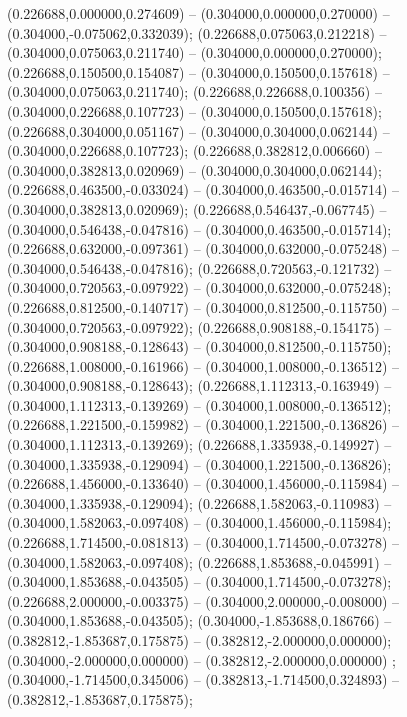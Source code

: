  (0.226688,0.000000,0.274609) -- (0.304000,0.000000,0.270000) -- (0.304000,-0.075062,0.332039);
 (0.226688,0.075063,0.212218) -- (0.304000,0.075063,0.211740) -- (0.304000,0.000000,0.270000);
 (0.226688,0.150500,0.154087) -- (0.304000,0.150500,0.157618) -- (0.304000,0.075063,0.211740);
 (0.226688,0.226688,0.100356) -- (0.304000,0.226688,0.107723) -- (0.304000,0.150500,0.157618);
 (0.226688,0.304000,0.051167) -- (0.304000,0.304000,0.062144) -- (0.304000,0.226688,0.107723);
 (0.226688,0.382812,0.006660) -- (0.304000,0.382813,0.020969) -- (0.304000,0.304000,0.062144);
 (0.226688,0.463500,-0.033024) -- (0.304000,0.463500,-0.015714) -- (0.304000,0.382813,0.020969);
 (0.226688,0.546437,-0.067745) -- (0.304000,0.546438,-0.047816) -- (0.304000,0.463500,-0.015714);
 (0.226688,0.632000,-0.097361) -- (0.304000,0.632000,-0.075248) -- (0.304000,0.546438,-0.047816);
 (0.226688,0.720563,-0.121732) -- (0.304000,0.720563,-0.097922) -- (0.304000,0.632000,-0.075248);
 (0.226688,0.812500,-0.140717) -- (0.304000,0.812500,-0.115750) -- (0.304000,0.720563,-0.097922);
 (0.226688,0.908188,-0.154175) -- (0.304000,0.908188,-0.128643) -- (0.304000,0.812500,-0.115750);
 (0.226688,1.008000,-0.161966) -- (0.304000,1.008000,-0.136512) -- (0.304000,0.908188,-0.128643);
 (0.226688,1.112313,-0.163949) -- (0.304000,1.112313,-0.139269) -- (0.304000,1.008000,-0.136512);
 (0.226688,1.221500,-0.159982) -- (0.304000,1.221500,-0.136826) -- (0.304000,1.112313,-0.139269);
 (0.226688,1.335938,-0.149927) -- (0.304000,1.335938,-0.129094) -- (0.304000,1.221500,-0.136826);
 (0.226688,1.456000,-0.133640) -- (0.304000,1.456000,-0.115984) -- (0.304000,1.335938,-0.129094);
 (0.226688,1.582063,-0.110983) -- (0.304000,1.582063,-0.097408) -- (0.304000,1.456000,-0.115984);
 (0.226688,1.714500,-0.081813) -- (0.304000,1.714500,-0.073278) -- (0.304000,1.582063,-0.097408);
 (0.226688,1.853688,-0.045991) -- (0.304000,1.853688,-0.043505) -- (0.304000,1.714500,-0.073278);
 (0.226688,2.000000,-0.003375) -- (0.304000,2.000000,-0.008000) -- (0.304000,1.853688,-0.043505);
 (0.304000,-1.853688,0.186766) -- (0.382812,-1.853687,0.175875) -- (0.382812,-2.000000,0.000000);
 (0.304000,-2.000000,0.000000) -- (0.382812,-2.000000,0.000000) ;
 (0.304000,-1.714500,0.345006) -- (0.382813,-1.714500,0.324893) -- (0.382812,-1.853687,0.175875);
